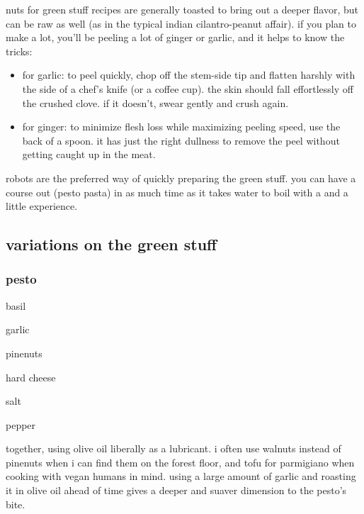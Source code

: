 nuts for green stuff recipes are generally toasted to bring out a deeper 
flavor, but can be raw as well (as in the typical indian cilantro-peanut 
affair). if you plan to make a lot, you'll be peeling a lot of ginger or 
garlic, and it helps to know the tricks:

\begin{itemize}
  \item for garlic: to peel quickly, chop off the stem-side tip and flatten 
  harshly with the side of a chef's knife (or a coffee cup). the skin should 
  fall effortlessly off the crushed clove. if it doesn't, swear gently and 
  crush again.

  \item for ginger: to minimize flesh loss while maximizing peeling speed, use 
  the back of a spoon. it has just the right dullness to remove the peel 
  without getting caught up in the meat.
\end{itemize}

robots are the preferred way of quickly preparing the green stuff. you can have 
a course out (pesto pasta) in as much time as it takes water to boil with a 
 and a little experience.

\subsection{variations on the green stuff}

\subsubsection{pesto}

\begin{ingredients}
  \item basil
  \item garlic
  \item pinenuts
  \item hard cheese
  \item salt
  \item pepper
\end{ingredients}

 together, using olive oil liberally as a lubricant. i often use walnuts 
instead of pinenuts when i can find them on the forest floor, and tofu for 
parmigiano when cooking with vegan humans in mind. using a large amount of 
garlic and roasting it in olive oil ahead of time gives a deeper and suaver 
dimension to the pesto's bite.

